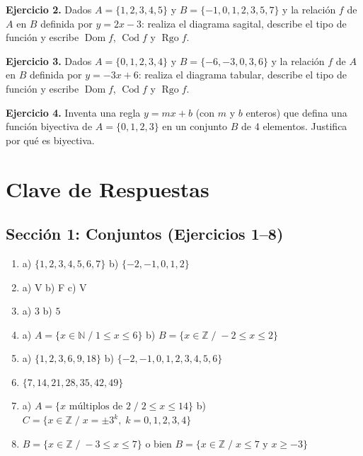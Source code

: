 \documentclass[12pt, letterpaper]{article}
\newcommand{\N}{\mathbb{N}}
\newcommand{\Z}{\mathbb{Z}}
\begin{document}
\textbf{Ejercicio 2.} Dados $A = \{1, 2, 3, 4, 5\}$ y $B = \{-1, 0, 1, 2, 3, 5, 7\}$ y la relación $f$ de $A$ en $B$ definida por $y = 2x - 3$: realiza el diagrama sagital, describe el tipo de función y escribe $\operatorname{Dom} f$, $\operatorname{Cod} f$ y $\operatorname{Rgo} f$.

\textbf{Ejercicio 3.} Dados $A = \{0, 1, 2, 3, 4\}$ y $B = \{-6, -3, 0, 3, 6\}$ y la relación $f$ de $A$ en $B$ definida por $y = -3x + 6$: realiza el diagrama tabular, describe el tipo de función y escribe $\operatorname{Dom} f$, $\operatorname{Cod} f$ y $\operatorname{Rgo} f$.

\textbf{Ejercicio 4.} Inventa una regla $y = mx + b$ (con $m$ y $b$ enteros) que defina una función biyectiva de $A = \{0, 1, 2, 3\}$ en un conjunto $B$ de 4 elementos. Justifica por qué es biyectiva.

\newpage

\ifmwclaves
  \section{Clave de Respuestas}

  \subsection*{Sección 1: Conjuntos (Ejercicios 1--8)}

  \begin{enumerate}[leftmargin=*, label=\textbf{\arabic*.}]
    \item a) $\{1, 2, 3, 4, 5, 6, 7\}$ \quad b) $\{-2, -1, 0, 1, 2\}$

    \item a) V \quad b) F \quad c) V

    \item a) $3$ \quad b) $5$

    \item a) $A = \{x \in \N \;/\; 1 \leq x \leq 6\}$ \quad b) $B = \{x \in \Z \;/\; -2 \leq x \leq 2\}$

    \item a) $\{1, 2, 3, 6, 9, 18\}$ \quad b) $\{-2, -1, 0, 1, 2, 3, 4, 5, 6\}$

    \item $\{7, 14, 21, 28, 35, 42, 49\}$

    \item a) $A = \{x \text{ múltiplos de } 2 \;/\; 2 \leq x \leq 14\}$ \quad b) $C = \{x \in \Z \;/\; x = \pm 3^k, \; k = 0, 1, 2, 3, 4\}$

    \item $B = \{x \in \Z \;/\; -3 \leq x \leq 7\}$ o bien $B = \{x \in \Z \;/\; x \leq 7 \text{ y } x \geq -3\}$
  \end{enumerate}
\end{document}
